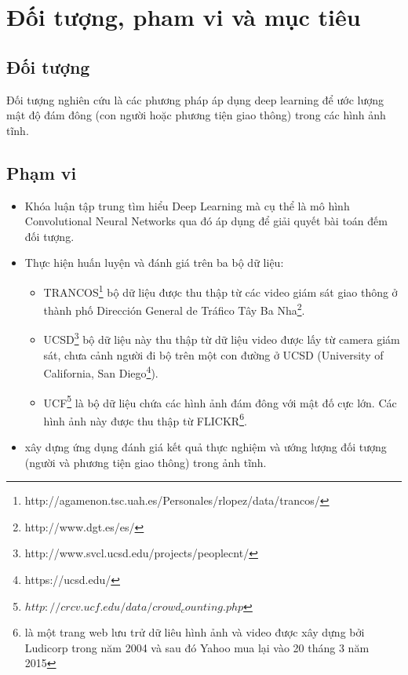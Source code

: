 \section{Đối tượng, pham vi và mục tiêu} 
\subsection{Đối tượng}
Đối tượng nghiên cứu là các phương pháp áp dụng deep learning để ước lượng mật độ đám đông (con người hoặc phương tiện giao thông) trong các hình ảnh tĩnh. 
\subsection{Phạm vi}
\begin{itemize}
\item Khóa luận tập trung tìm hiểu Deep Learning mà cụ thể là mô hình Convolutional Neural Networks qua đó áp dụng để giải quyết bài toán đếm đối tượng.
\item Thực hiện huấn luyện và đánh giá trên ba bộ dữ liệu:
	\begin{itemize}
 	\item TRANCOS\footnote{http://agamenon.tsc.uah.es/Personales/rlopez/data/trancos/} bộ dữ liệu được thu thập từ các video giám sát giao thông ở thành phố Dirección General de Tráfico Tây Ba Nha\footnote{http://www.dgt.es/es/}.
	\item UCSD\footnote{http://www.svcl.ucsd.edu/projects/peoplecnt/} bộ dữ liệu này thu thập từ dữ liệu video được lấy từ camera giám sát, chưa cảnh người đi bộ trên một con đường ở UCSD (University of California, San Diego\footnote{https://ucsd.edu/}).
	
	\item UCF\footnote{$http://crcv.ucf.edu/data/crowd_counting.php$} là bộ dữ liệu chứa các hình ảnh đám đông với mật đố cực lớn. Các hình ảnh này được thu thập từ FLICKR\footnote{là một trang web lưu trử dữ liêu hình ảnh và video được xây dựng bởi Ludicorp trong năm 2004 và sau đó Yahoo mua lại vào 20 tháng 3 năm 2015}. 
	\end{itemize}
\item xây dựng ứng dụng đánh giá kết quả thực nghiệm và ướng lượng đối tượng (người và phương tiện giao thông) trong ảnh tĩnh.
\end{itemize}

